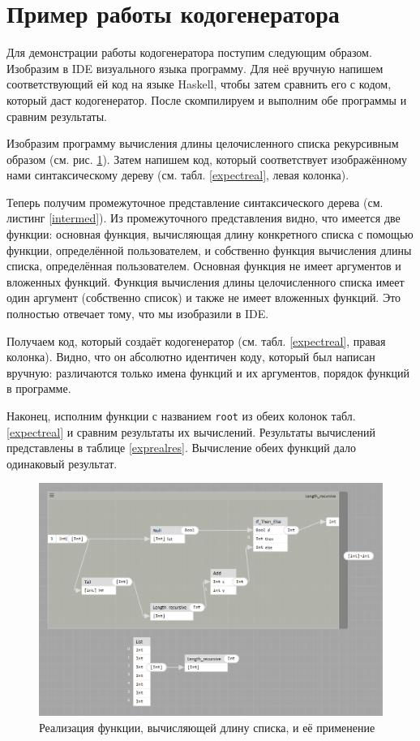 \section{Пример работы кодогенератора}
Для демонстрации работы кодогенератора поступим следующим образом. Изобразим в IDE визуального языка программу. Для неё вручную напишем соответствующий ей код на языке Haskell, чтобы затем сравнить его с кодом, который даст кодогенератор. После скомпилируем и выполним обе программы и сравним результаты.

Изобразим программу вычисления длины целочисленного списка рекурсивным образом (см. рис. \ref{lengthrec}). Затем напишем код, который соответствует изображённому нами синтаксическому дереву (см. табл. \ref{expectreal}, левая колонка). 

Теперь получим промежуточное представление синтаксического дерева (см. листинг \ref{intermed}). Из промежуточного представления видно, что имеется две функции: основная функция, вычисляющая длину конкретного списка с помощью функции, определённой пользователем, и собственно функция вычисления длины списка, определённая пользователем. Основная функция не имеет аргументов и вложенных функций. Функция вычисления длины целочисленного списка имеет один аргумент (собственно список) и также не имеет вложенных функций. Это полностью отвечает тому, что мы изобразили в IDE.

Получаем код, который создаёт кодогенератор (см. табл. \ref{expectreal}, правая колонка). Видно, что он абсолютно идентичен коду, который был написан вручную: различаются только имена функций и их аргументов, порядок функций в программе.

Наконец, исполним функции с названием \lstinline!root! из обеих колонок табл. \ref{expectreal} и сравним результаты их вычислений. Результаты вычислений представлены в таблице \ref{exprealres}. Вычисление обеих функций дало одинаковый результат.

\begin{figure}[p]
\centering
\includegraphics[width=\textwidth]{img/length.PNG}
\caption{Реализация функции, вычисляющей длину списка, и её применение} \label{lengthrec}	
\end{figure}

